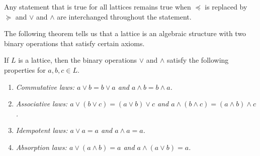  
\medskip
 
 
Any statement that is true for all lattices remains true when
$\preceq$ is replaced by $\succeq$ and $\vee$ and $\wedge$ are
interchanged throughout the statement.
 
 
\medskip
 
 
The following theorem tells us that a lattice is an algebraic
structure with two binary operations that satisfy certain
axioms.						     
 
 
\begin{theorem}
If $L$ is a lattice, then the binary operations $\vee$ and $\wedge$
satisfy the following properties for $a, b, c \in L$.
\begin{enumerate}
 
\rm \item \it
Commutative laws: $a \vee b = b \vee a$ and $a \wedge b = b \wedge a$.
 
\rm \item \it
Associative laws: $a \vee ( b \vee c) = (a \vee b) \vee c$ and $a \wedge (
b \wedge c) = (a \wedge b) \wedge c$. 
 
\rm \item \it
Idempotent laws: $a \vee a = a$ and $a \wedge a = a$.
 
\rm \item \it
Absorption laws: $a \vee (a \wedge b) = a$ and $a \wedge ( a \vee b ) =a$.
 
\end{enumerate}
\end{theorem}
 
